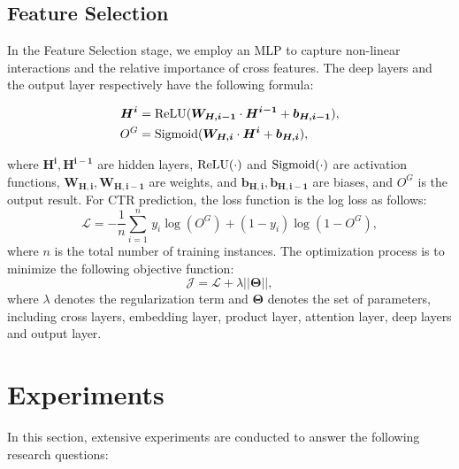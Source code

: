 \documentclass[letterpaper]{article} \usepackage{aaai21}  \usepackage{times}  \usepackage{helvet} \usepackage{courier}  \usepackage[hyphens]{url}  \usepackage{graphicx} \urlstyle{rm} \def\UrlFont{\rm}  \usepackage{natbib}  \usepackage{caption} \frenchspacing  \setlength{\pdfpagewidth}{8.5in}  \setlength{\pdfpageheight}{11in}  \usepackage{graphicx}
\begin{document}
\vspace{-0.1cm}
\subsection{Feature Selection}

In the Feature Selection stage, we employ an MLP to capture non-linear interactions and the relative importance of cross features. The deep layers and the output layer respectively have the following formula: 
\begin{small}
	\begin{equation}
	\begin{aligned}
	\bm{H^i} &= {\rm{ReLU}} ( \bm{W_{H,i-1} } \cdot \bm{H^{i-1}} + \bm{ b_{H,i-1} } ), \\
	O^G &= {\rm{Sigmoid}} (\bm{W_{H,i}} \cdot \bm{H^i} + \bm{b_{H,i}} ),
	\end{aligned}
	\end{equation}
\end{small}where $\bm{H^i}, \bm{H^{i-1}}$ are hidden layers, ${\rm{ReLU}} (\cdot)$ and ${\rm{Sigmoid}}(\cdot)$ are activation functions, $\bm{W_{H,i}}, \bm{W_{H,i-1} }$ are weights, and $\bm{b_{H,i}}, \bm{ b_{H,i-1} }$ are biases, and $O^G$ is the output result. For CTR prediction, the loss function is the log loss as follows:
\begin{equation}
\bm{\mathcal{L}} = - \frac{1}{n} \sum^n_{i=1} \, y_i \log(O^G) + (1-y_i) \log(1-O^G),
\end{equation}where $n$ is the total number of training instances. The optimization process is to minimize the following objective function: 
\begin{equation}
\bm{\mathcal{J}} = \bm{\mathcal{L}} + \lambda ||\bm{\Theta}||,
\end{equation}where $\lambda$ denotes the regularization term and $\bm{\Theta}$ denotes the set of parameters, including cross layers, embedding layer, product layer, attention layer, deep layers and output layer.

\vspace{-0.1cm}
\section{Experiments}

In this section, extensive experiments are conducted to answer the following research questions:
\end{document}
